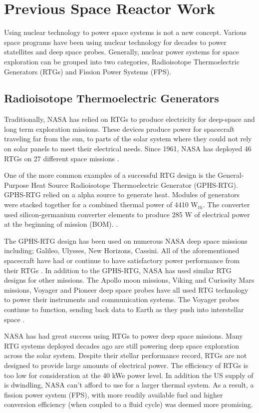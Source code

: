 \section{Previous Space Reactor Work}
Using nuclear technology to power space systems is not a new concept. Various
space programs have been using nuclear technology for decades to power
statellites and deep space probes. Generally, nuclear power systems for space
exploration can be grouped into two categories, Radioisotope Thermoelectric
Generators (RTGs) and Fission Power Systems (FPS). 

\subsection{Radioisotope Thermoelectric Generators}
Traditionally, NASA has relied on RTGs to
produce electricity for deep-space and long term exploration missions. These
devices produce power for spacecraft traveling far from the sun, to parts of the
solar system where they could not rely on solar panels to meet their electrical
needs. Since 1961, NASA has deployed 46 RTGs on 27 different space missions
\citep{mmrtg_fact}.

One of the more common examples of a successful RTG design is the
General-Purpose Heat Source Radioisotope Thermoelectric Generator (GPHS-RTG).
GPHS-RTG relied on a \pu alpha source to generate heat. Modules of \pu
generators were stacked together for a combined thermal power of 4410
W$_{th}$. The
converter used silicon-germanium converter elements to produce 285 W of
electrical power at the beginning of mission (BOM).
\citep{bennett_mission_2006}. 

The GPHS-RTG design has been used on
numerous NASA deep space missions including; Galileo, Ulysses, New Horizons,
Cassini. All of the aforementioned spacecraft have had or continue to have
satisfactory power performance from their RTGs \citep{bennett_mission_2006}.
In addition to the GPHS-RTG, NASA has used similar RTG designs for other
missions. The Apollo moon missions, Viking and Curiosity Mars missions, Voyager
and Pioneer deep space probes have all used RTG technology to power their
instruments and communication systems. The Voyager probes continue to function,
sending back data to Earth as they push into interstellar space
\citep{mmrtg_fact}.

NASA has had great success using RTGs to power deep space missions. Many
RTG systems deployed decades ago are still powering deep space exploration
across the solar system. Despite their stellar performance record, RTGs are not
designed to provide large amounts of electrical power. The efficiency of RTGs is
too low for consideration at the 40 kWe power level. In addition the US supply of \pu
is dwindling, NASA can't afford to use \pu for a larger thermal system. As a
result, a fission power system (FPS), with more readily available fuel and higher conversion
efficiency (when coupled to a fluid cycle) was deemed more promising.

